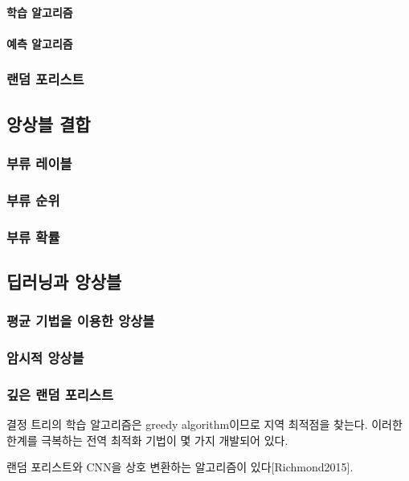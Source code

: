 \documentclass [12pt] {oblivoir}
\let\oldsubsubsection=\subsubsection
\renewcommand{\subsubsection}
{
  \filbreak
  \oldsubsubsection
}
\begin{document}
\vspace{3mm}

\paragraph*{학습 알고리즘}\mbox{}

\vspace{3mm}

\paragraph*{예측 알고리즘}\mbox{}

\vspace{3mm}

\subsubsection{랜덤 포리스트}

\subsection{앙상블 결합}

\subsubsection{부류 레이블}

\subsubsection{부류 순위}

\subsubsection{부류 확률}

\subsection{딥러닝과 앙상블}

\subsubsection{평균 기법을 이용한 앙상블}

\subsubsection{암시적 앙상블}

\subsubsection{깊은 랜덤 포리스트}

결정 트리의 학습 알고리즘은 greedy algorithm이므로 지역 최적점을 찾는다. 이러한 한계를 극복하는 전역 최적화 기법이 몇 가지 개발되어 있다.

\vspace{3mm}
랜덤 포리스트와 CNN을 상호 변환하는 알고리즘이 있다[Richmond2015].
\end{document}
